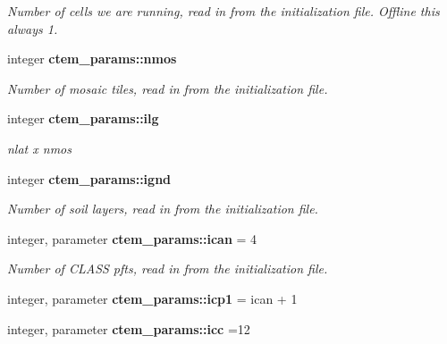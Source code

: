 \begin{DoxyCompactItemize}
\begin{DoxyCompactList}\small\item\em Number of cells we are running, read in from the initialization file. Offline this always 1. \end{DoxyCompactList}\item 
\hypertarget{namespacectem__params_a709bce69d7f5723c5fd993cde63d6c28}{}integer {\bfseries ctem\+\_\+params\+::nmos}\label{namespacectem__params_a709bce69d7f5723c5fd993cde63d6c28}

\begin{DoxyCompactList}\small\item\em Number of mosaic tiles, read in from the initialization file. \end{DoxyCompactList}\item 
\hypertarget{namespacectem__params_a158e1192d4b6986f289b85b1b60f0c70}{}integer {\bfseries ctem\+\_\+params\+::ilg}\label{namespacectem__params_a158e1192d4b6986f289b85b1b60f0c70}

\begin{DoxyCompactList}\small\item\em nlat x nmos \end{DoxyCompactList}\item 
\hypertarget{namespacectem__params_a1bd232157d683ed546942e41d55415ac}{}integer {\bfseries ctem\+\_\+params\+::ignd}\label{namespacectem__params_a1bd232157d683ed546942e41d55415ac}

\begin{DoxyCompactList}\small\item\em Number of soil layers, read in from the initialization file. \end{DoxyCompactList}\item 
\hypertarget{namespacectem__params_af834d482b4eec80d530f6f6afc9fc5b5}{}integer, parameter {\bfseries ctem\+\_\+params\+::ican} = 4\label{namespacectem__params_af834d482b4eec80d530f6f6afc9fc5b5}

\begin{DoxyCompactList}\small\item\em Number of C\+L\+A\+S\+S pfts, read in from the initialization file. \end{DoxyCompactList}\item 
\hypertarget{namespacectem__params_a8b61932a368c557cc3cb7edf6de23e22}{}integer, parameter {\bfseries ctem\+\_\+params\+::icp1} = ican + 1\label{namespacectem__params_a8b61932a368c557cc3cb7edf6de23e22}

\item 
\hypertarget{namespacectem__params_afa448c586accb0aa6dade1df419eb2fd}{}integer, parameter {\bfseries ctem\+\_\+params\+::icc} =12\label{namespacectem__params_afa448c586accb0aa6dade1df419eb2fd}


\end{DoxyCompactItemize}
